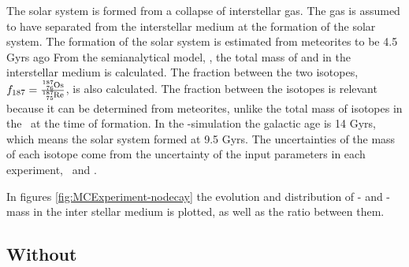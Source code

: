 The solar system is formed from a collapse of interstellar gas. The gas is assumed to have separated from the interstellar medium at the formation of the solar system.
The formation of the solar system is estimated from meteorites to be 4.5 Gyrs ago 
From the semianalytical model, \omegamodel, the total mass of  and  in the interstellar medium is calculated.
The fraction between the two isotopes, $f_{187} = \frac{\os{187}}{\re{187}}$, is also calculated.
The fraction between the isotopes is relevant because it can be determined from meteorites, unlike the total mass of isotopes in the \sos\ at the time of formation.
In the \eris-simulation the galactic age is 14 Gyrs, which means the solar system formed at 9.5 Gyrs.
The uncertainties of the mass of each isotope come from the uncertainty of the input parameters in each experiment, \expone\ and \exptwo.

In figures \ref{fig:MCExperiment-nodecay} the evolution and distribution of - and -mass in the inter stellar medium is plotted, as well as the ratio between them. 

\FloatBarrier %

\subsection{Without \betadecay}
\setlength{\subfigwidth}{0.40\textwidth}
\setlength{\figwidth}{0.6\textwidth}


